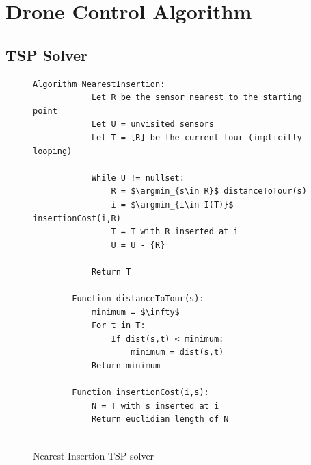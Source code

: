 \documentclass[10pt,a4paper]{article}
\DeclareMathOperator*{\argmin}{arg\,min}
\begin{document}
\section{Drone Control Algorithm}
\subsection{TSP Solver}


\begin{figure}[H]
    \begin{lstlisting}[style=mystyle]
        Algorithm NearestInsertion:
            Let R be the sensor nearest to the starting point
            Let U = unvisited sensors
            Let T = [R] be the current tour (implicitly looping)

            While U != nullset:
                R = $\argmin_{s\in R}$ distanceToTour(s) 
                i = $\argmin_{i\in I(T)}$ insertionCost(i,R)
                T = T with R inserted at i
                U = U - {R}
            
            Return T

        Function distanceToTour(s):
            minimum = $\infty$
            For t in T:
                If dist(s,t) < minimum:
                    minimum = dist(s,t)
            Return minimum
        
        Function insertionCost(i,s):
            N = T with s inserted at i
            Return euclidian length of N
        

    \end{lstlisting}
    \caption{Nearest Insertion TSP solver}
    \label{alg:ni}
\end{figure}
\end{document}
